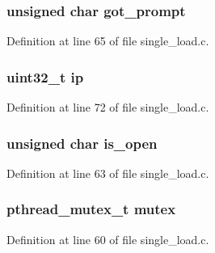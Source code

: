 \subsubsection[{\texorpdfstring{got\+\_\+prompt}{got_prompt}}]{\setlength{\rightskip}{0pt plus 5cm}unsigned char got\+\_\+prompt}\hypertarget{structstate_slot__t_a30b88cb38c48a1b8ea676f58ec9ca224}{}\label{structstate_slot__t_a30b88cb38c48a1b8ea676f58ec9ca224}


Definition at line 65 of file single\+\_\+load.\+c.

\subsubsection[{\texorpdfstring{ip}{ip}}]{\setlength{\rightskip}{0pt plus 5cm}uint32\+\_\+t ip}\hypertarget{structstate_slot__t_a69ddb9c845da426f636d9dd0dbed4e7e}{}\label{structstate_slot__t_a69ddb9c845da426f636d9dd0dbed4e7e}


Definition at line 72 of file single\+\_\+load.\+c.

\subsubsection[{\texorpdfstring{is\+\_\+open}{is_open}}]{\setlength{\rightskip}{0pt plus 5cm}unsigned char is\+\_\+open}\hypertarget{structstate_slot__t_adc1e9511c9cfe12e03d6145675caf75b}{}\label{structstate_slot__t_adc1e9511c9cfe12e03d6145675caf75b}


Definition at line 63 of file single\+\_\+load.\+c.

\subsubsection[{\texorpdfstring{mutex}{mutex}}]{\setlength{\rightskip}{0pt plus 5cm}pthread\+\_\+mutex\+\_\+t mutex}\hypertarget{structstate_slot__t_a4acff8232e4aec9cd5c6dc200ac55ef3}{}\label{structstate_slot__t_a4acff8232e4aec9cd5c6dc200ac55ef3}


Definition at line 60 of file single\+\_\+load.\+c.

